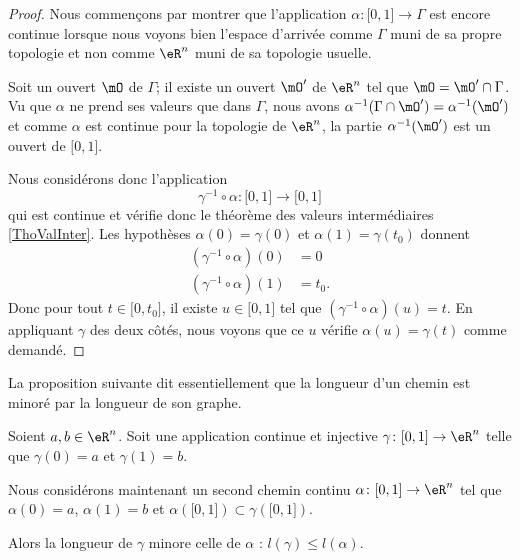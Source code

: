 \begin{proof}
	Nous commençons par montrer que l'application \( \alpha\colon \mathopen[ 0 , 1 \mathclose]\to \Gamma\) est encore continue lorsque nous voyons bien l'espace d'arrivée comme \( \Gamma\) muni de sa propre topologie et non comme \( \eR^n\) muni de sa topologie usuelle.

	Soit un ouvert \( \mO\) de \( \Gamma\); il existe un ouvert \( \mO'\) de \( \eR^n\) tel que \( \mO=\mO'\cap \Gamma\). Vu que \( \alpha\) ne prend ses valeurs que dans \( \Gamma\), nous avons \( \alpha^{-1}(\Gamma\cap \mO')=\alpha^{-1}(\mO')\) et comme \( \alpha\) est continue pour la topologie de \( \eR^n\), la partie \( \alpha^{-1}(\mO')\) est un ouvert de \( \mathopen[ 0 , 1 \mathclose]\).

	Nous considérons donc l'application
	\begin{equation}
		\gamma^{-1}\circ\alpha\colon \mathopen[ 0 , 1 \mathclose]\to \mathopen[ 0 , 1 \mathclose]
	\end{equation}
	qui est continue et vérifie donc le théorème des valeurs intermédiaires \ref{ThoValInter}. Les hypothèses \( \alpha(0)=\gamma(0)\) et \( \alpha(1)=\gamma(t_0)\) donnent
	\begin{subequations}
		\begin{align}
			(\gamma^{-1}\circ\alpha)(0) & =0    \\
			(\gamma^{-1}\circ\alpha)(1) & =t_0.
		\end{align}
	\end{subequations}
	Donc pour tout \( t\in \mathopen[ 0 , t_0 \mathclose]\), il existe \( u\in \mathopen[ 0 , 1 \mathclose]\) tel que \( (\gamma^{-1}\circ \alpha)(u)=t\). En appliquant \( \gamma\) des deux côtés, nous voyons que ce \( u\) vérifie \( \alpha(u)=\gamma(t)\) comme demandé.
\end{proof}

La proposition suivante dit essentiellement que la longueur d'un chemin est minoré par la longueur de son graphe.
\begin{proposition}      \label{PROPooXENVooMvkTZW}
	Soient \( a,b\in \eR^n\). Soit une application continue et injective \( \gamma\colon \mathopen[ 0 , 1 \mathclose]\to \eR^n\) telle que \( \gamma(0)=a\) et \( \gamma(1)=b\).

	Nous considérons maintenant un second chemin continu \( \alpha\colon \mathopen[ 0 , 1 \mathclose]\to \eR^n\) tel que \( \alpha(0)=a\), \( \alpha(1)=b\) et \( \alpha(\mathopen[ 0 , 1 \mathclose])\subset\gamma(\mathopen[ 0 , 1 \mathclose])\).

	Alors la longueur de \( \gamma\) minore celle de \( \alpha\) : \( l(\gamma)\leq l(\alpha)\).
\end{proposition}

